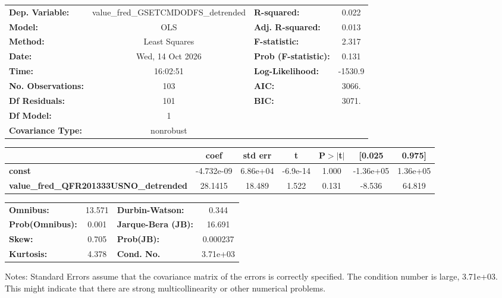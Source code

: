 \begin{center}
\begin{tabular}{lclc}
\toprule
\textbf{Dep. Variable:}                        & value\_fred\_GSETCMDODFS\_detrended & \textbf{  R-squared:         } &     0.022   \\
\textbf{Model:}                                &                 OLS                 & \textbf{  Adj. R-squared:    } &     0.013   \\
\textbf{Method:}                               &            Least Squares            & \textbf{  F-statistic:       } &     2.317   \\
\textbf{Date:}                                 &           Wed, 14 Oct 2026          & \textbf{  Prob (F-statistic):} &    0.131    \\
\textbf{Time:}                                 &               16:02:51              & \textbf{  Log-Likelihood:    } &   -1530.9   \\
\textbf{No. Observations:}                     &                   103               & \textbf{  AIC:               } &     3066.   \\
\textbf{Df Residuals:}                         &                   101               & \textbf{  BIC:               } &     3071.   \\
\textbf{Df Model:}                             &                     1               & \textbf{                     } &             \\
\textbf{Covariance Type:}                      &              nonrobust              & \textbf{                     } &             \\
\bottomrule
\end{tabular}
\begin{tabular}{lcccccc}
                                               & \textbf{coef} & \textbf{std err} & \textbf{t} & \textbf{P$> |$t$|$} & \textbf{[0.025} & \textbf{0.975]}  \\
\midrule
\textbf{const}                                 &   -4.732e-09  &     6.86e+04     &  -6.9e-14  &         1.000        &    -1.36e+05    &     1.36e+05     \\
\textbf{value\_fred\_QFR201333USNO\_detrended} &      28.1415  &       18.489     &     1.522  &         0.131        &       -8.536    &       64.819     \\
\bottomrule
\end{tabular}
\begin{tabular}{lclc}
\textbf{Omnibus:}       & 13.571 & \textbf{  Durbin-Watson:     } &    0.344  \\
\textbf{Prob(Omnibus):} &  0.001 & \textbf{  Jarque-Bera (JB):  } &   16.691  \\
\textbf{Skew:}          &  0.705 & \textbf{  Prob(JB):          } & 0.000237  \\
\textbf{Kurtosis:}      &  4.378 & \textbf{  Cond. No.          } & 3.71e+03  \\
\bottomrule
\end{tabular}
\end{center}

Notes: \newline
 [1] Standard Errors assume that the covariance matrix of the errors is correctly specified. \newline
 [2] The condition number is large, 3.71e+03. This might indicate that there are \newline
 strong multicollinearity or other numerical problems.